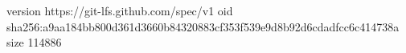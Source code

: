 version https://git-lfs.github.com/spec/v1
oid sha256:a9aa184bb800d361d3660b84320883cf353f539e9d8b92d6cdadfcc6c414738a
size 114886
